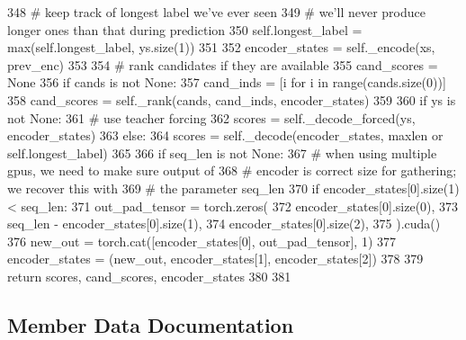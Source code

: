 \begin{DoxyCode}
348             \textcolor{comment}{# keep track of longest label we've ever seen}
349             \textcolor{comment}{# we'll never produce longer ones than that during prediction}
350             self.longest\_label = max(self.longest\_label, ys.size(1))
351 
352         encoder\_states = self.\_encode(xs, prev\_enc)
353 
354         \textcolor{comment}{# rank candidates if they are available}
355         cand\_scores = \textcolor{keywordtype}{None}
356         \textcolor{keywordflow}{if} cands \textcolor{keywordflow}{is} \textcolor{keywordflow}{not} \textcolor{keywordtype}{None}:
357             cand\_inds = [i \textcolor{keywordflow}{for} i \textcolor{keywordflow}{in} range(cands.size(0))]
358             cand\_scores = self.\_rank(cands, cand\_inds, encoder\_states)
359 
360         \textcolor{keywordflow}{if} ys \textcolor{keywordflow}{is} \textcolor{keywordflow}{not} \textcolor{keywordtype}{None}:
361             \textcolor{comment}{# use teacher forcing}
362             scores = self.\_decode\_forced(ys, encoder\_states)
363         \textcolor{keywordflow}{else}:
364             scores = self.\_decode(encoder\_states, maxlen \textcolor{keywordflow}{or} self.longest\_label)
365 
366         \textcolor{keywordflow}{if} seq\_len \textcolor{keywordflow}{is} \textcolor{keywordflow}{not} \textcolor{keywordtype}{None}:
367             \textcolor{comment}{# when using multiple gpus, we need to make sure output of}
368             \textcolor{comment}{# encoder is correct size for gathering; we recover this with}
369             \textcolor{comment}{# the parameter seq\_len}
370             \textcolor{keywordflow}{if} encoder\_states[0].size(1) < seq\_len:
371                 out\_pad\_tensor = torch.zeros(
372                     encoder\_states[0].size(0),
373                     seq\_len - encoder\_states[0].size(1),
374                     encoder\_states[0].size(2),
375                 ).cuda()
376                 new\_out = torch.cat([encoder\_states[0], out\_pad\_tensor], 1)
377                 encoder\_states = (new\_out, encoder\_states[1], encoder\_states[2])
378 
379         \textcolor{keywordflow}{return} scores, cand\_scores, encoder\_states
380 
381 
\end{DoxyCode}


\subsection{Member Data Documentation}
\mbox{\label{classparlai_1_1agents_1_1legacy__agents_1_1seq2seq_1_1modules__v1_1_1Seq2seq_ae2751bbf922e0897d10d904340f62a1c}} 
